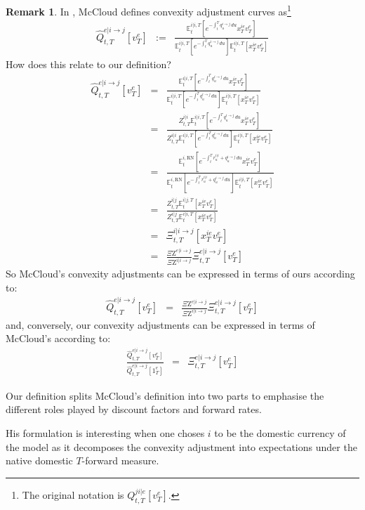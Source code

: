 \documentclass[11pt,english]{amsart}
\newcommand{\RN}{\mathrm{RN}}
\newcommand{\EE}{\mathbb{E}}
\newcommand{\Q}{\Xi}
\newcommand{\QZ}{{\Xi\mathrm{Z}}}
\theoremstyle{definition}
\newtheorem{rema}{Remark}
\begin{document}
\begin{rema}
In \cite{McCloud:CollateralVolatility}, McCloud defines convexity adjustment curves as\footnote{The original notation is $Q^{ji|e}_{t,T} [ v^e_T ]$.} 
\begin{eqnarray}
  \widehat{Q}^{e|i\to j}_{t,T} [ v^e_T ]
   &:=& \frac{\EE^{i|i,T}_t\left[ e^{-\int_t^T q^{i\to j}_u \,du} x^{ie}_Tv^e_T \right] } {\EE^{i|i,T}_t\left[ e^{-\int_t^T q^{i\to j}_u \,du}  \right]  \EE^{i|i,T}_t\left[ x^{ie}_Tv^e_T \right]  }  
\end{eqnarray}
How does this relate to our definition?
\begin{eqnarray*}
  \widehat{Q}^{e|i\to j}_{t,T} [ v^e_T ]
   &=& \frac{\EE^{i|i,T}_t\left[ e^{-\int_t^T q^{i\to j}_u \,du} x^{ie}_Tv^e_T \right] } {\EE^{i|i,T}_t\left[ e^{-\int_t^T q^{i\to j}_u \,du}  \right]  \EE^{i|i,T}_t\left[ x^{ie}_Tv^e_T \right]  }  \\
   &=& \frac{Z^{i|i}_{t,T}\EE^{i|i,T}_t\left[ e^{-\int_t^T q^{i\to j}_u \,du} x^{ie}_Tv^e_T \right] } {Z^{i|i}_{t,T}\EE^{i|i,T}_t\left[ e^{-\int_t^T q^{i\to j}_u \,du}  \right]  \EE^{i|i,T}_t\left[ x^{ie}_Tv^e_T \right]  }  \\
   &=& \frac{\EE^{i,\RN}_t\left[ e^{-\int_t^T r^{i|i}_u + q^{i\to j}_u \,du} x^{ie}_Tv^e_T \right] } {\EE^{i,\RN}_t\left[ e^{-\int_t^T r^{i|i}_u + q^{i\to j}_u \,du}  \right]  \EE^{i|i,T}_t\left[ x^{ie}_Tv^e_T \right]  }  \\
   &=& \frac{Z^{i|j}_{t,T}\EE^{i|j,T}_t\left[  x^{ie}_Tv^e_T \right] } {Z^{i|j}_{t,T} \EE^{i|i,T}_t\left[ x^{ie}_Tv^e_T \right]  }  \\
   &=& \Q^{i|i\to j}_{t,T} [ x^{ie}_Tv^e_T ] \\
   &=& \frac{\QZ^{e|i\to j}}{\QZ^{i|i\to j}} \Q^{e|i\to j}_{t,T} [ v^e_T ]
\end{eqnarray*}
So McCloud's convexity adjustments can be expressed in terms of ours according to:
\begin{eqnarray}
   \widehat{Q}^{e|i\to j}_{t,T} [ v^e_T ] 
   &=& \frac{\QZ^{e|i\to j}}{\QZ^{i|i\to j}}   \Q^{e|i\to j}_{t,T} [ v^e_T ] 
\end{eqnarray}
and, conversely, our convexity adjustments can be expressed in terms of McCloud's according to:
\begin{eqnarray}
  \frac{\widehat{Q}^{e|i\to j}_{t,T} [ v^e_T ]}{\widehat{Q}^{e|i\to j}_{t,T} [ 1^e_T ]}
   &=& \Q^{e|i\to j}_{t,T} [ v^e_T ]  
\end{eqnarray}

Our definition splits McCloud's definition into two parts to emphasise the different roles played by discount factors and forward rates.
 
His formulation is interesting when one choses $i$ to be the domestic currency of the model as it decomposes the convexity adjustment into expectations under the native domestic $T$-forward measure. 
\end{rema}
\end{document}
